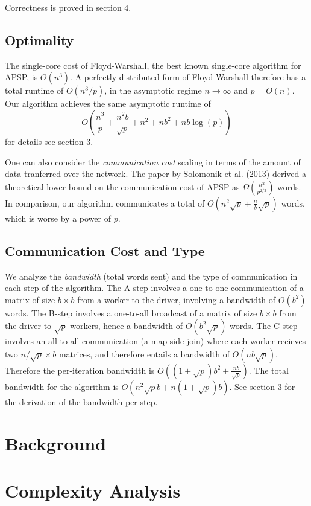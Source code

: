 \documentclass{article} %
\begin{document}
Correctness is proved in section 4.

\subsection{Optimality}

The single-core cost of Floyd-Warshall, the best known single-core
algorithm for APSP, is $O(n^3)$.  A perfectly distributed form of
Floyd-Warshall therefore has a total runtime of $O(n^3/p)$, in the
asymptotic regime $n \to \infty$ and $p = O(n)$.  Our algorithm
achieves the same asymptotic runtime of
\[
O\left(\frac{n^3}{p} + \frac{n^2b}{\sqrt{p}} + n^2 + nb^2 + nb\log(p)\right)
\]
for details see section 3.

One can also consider the \emph{communication cost} scaling in terms
of the amount of data tranferred over the network.  The paper by
Solomonik et al. (2013) derived a theoretical lower bound on the
communication cost of APSP as $\Omega(\frac{n^2}{p^{2/3}})$ words.  In
comparison, our algorithm communicates a total of $O(n^2\sqrt{p} + \frac{n}{b}\sqrt{p})$
words, which is worse by a power of $p$.

\subsection{Communication Cost and Type}

We analyze the \emph{bandwidth} (total words sent) and the type of
communication in each step of the algorithm.  The A-step involves a
one-to-one communication of a matrix of size $b \times b$ from a
worker to the driver, involving a bandwidth of $O(b^2)$ words.  The
B-step involves a one-to-all broadcast of a matrix of size $b\times b$
from the driver to $\sqrt{p}$ workers, hence a bandwidth of $O(b^2
\sqrt{p})$ words.  The C-step involves an all-to-all communication (a
map-side join) where each worker recieves two $n/\sqrt{p} \times b$
matrices, and therefore entails a bandwidth of $O(nb\sqrt{p})$.
Therefore the per-iteration bandwidth is $O((1 + \sqrt{p})b^2 +
\frac{nb}{\sqrt{p}})$.  The total bandwidth for the algorithm is
$O(n^2\sqrt{p}b + n(1+\sqrt{p})b)$.  See section 3 for the derivation
of the bandwidth per step.

\section{Background}

\section{Complexity Analysis}
\end{document}
